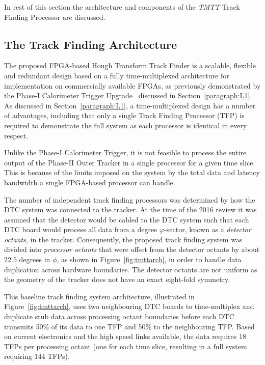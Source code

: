 In rest of this section the architecture and components of the \emph{TMTT} Track Finding Processor are discussed. 

\subsection{The Track Finding Architecture}\label{subsec:TFA}
The proposed FPGA-based Hough Transform Track Finder is a scalable, flexible and redundant design based on a fully time-multiplexed architecture for implementation on commercially available FPGAs, as previously demonstrated by the Phase-I Calorimeter Trigger Upgrade~\cite{phase1L1TDR} discussed in Section~\ref{paragraph:L1}.
As discussed in Section~\ref{paragraph:L1}, a time-multiplexed design has a number of advantages, including that only a single Track Finding Processor (TFP) is required to demonstrate the full system as each processor is identical in every respect.

Unlike the Phase-I Calorimeter Trigger, it is not feasible to process the entire output of the Phase-II Outer Tracker in a single processor for a given time slice.
This is because of the limits imposed on the system by the total data and latency bandwidth a single FPGA-based processor can handle.

The number of independent track finding processors was determined by how the DTC system was connected to the tracker.
At the time of the 2016 review it was assumed that the detector would be cabled to the DTC system such that each DTC board would process all data from a  degree $\varphi$-sector, known as a \emph{detector octants}, in the tracker.
Consequently, the proposed track finding system was divided into \emph{processor octants} that were offset from the detector octants by about $22.5$ degrees in $\phi$, as shown in Figure~\ref{fig:tmttarch}, in order to handle data duplication across hardware boundaries.
The detector octants are not uniform as the geometry of the tracker does not have an exact eight-fold symmetry.

This baseline track finding system architecture, illustrated in Figure~\ref{fig:tmttarch}, uses two neighbouring DTC boards to time-multiplex and duplicate stub data across processing octant boundaries before each DTC transmits 50\% of its data to one TFP and 50\% to the neighbouring TFP.
Based on current electronics and the high speed links available, the data requires 18 TFPs per processing octant (one for each time slice, resulting in a full system requiring 144 TFPs).

